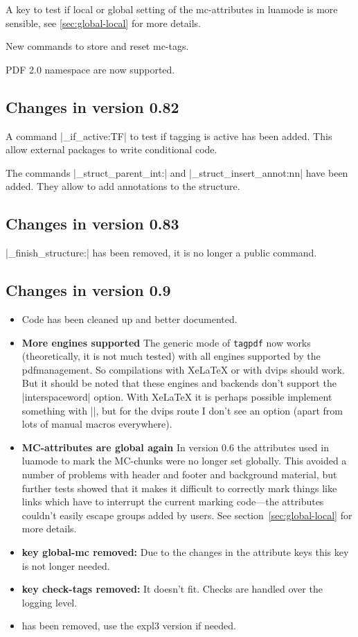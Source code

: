 \documentclass[DIV=12,parskip=half-,bibliography=totoc]{scrartcl}
\newcommand\pkg[1]{\texttt{#1}}
\begin{document}
A key to test if local or global setting of the mc-attributes in luamode is more sensible, see \ref{sec:global-local} for more details.

New commands to store and reset mc-tags.

PDF 2.0 namespace are now supported.

\subsection{Changes in version 0.82}

A command |\tag_if_active:TF| to test if tagging is active has been added. This allow external packages to write conditional code.

The commands |\tag_struct_parent_int:| and |\tag_struct_insert_annot:nn| have been added. They allow to
add annotations to the structure.


\subsection{Changes in version 0.83}

|\tag_finish_structure:| has been removed, it is no longer a public command.

\subsection{Changes in version 0.9}

\begin{itemize}
\item Code has been cleaned up and better documented.

\item \textbf{More engines supported} The generic mode of \pkg{tagpdf} now works
(theoretically, it is not much tested) with all engines supported
by the pdfmanagement. So compilations with Xe\LaTeX{} or with dvips should work. But it should be noted that
these engines and backends don't support the |interspaceword| option. With Xe\LaTeX{} it is perhaps possible
implement something with |\XeTeXinterchartoks|, but for the dvips route I don't see an option (apart from lots
of manual macros everywhere).
\item \textbf{MC-attributes are global again} In version 0.6 the attributes used in
luamode to mark the MC-chunks were no longer set globally. This avoided a number of problems with header and footer
and background material, but further tests showed that it makes it difficult to correctly mark things like
links which have to interrupt the current marking code---the attributes couldn't easily escape groups added by
users. See section~\ref{sec:global-local} for more details.
\item \textbf{key global-mc removed:} Due to the changes in the attribute keys this key is not longer needed.
\item \textbf{key check-tags removed:} It doesn't fit. Checks are handled over the logging level.
\item {} has been removed, use the expl3 version if needed.
\end{itemize}
\end{document}
